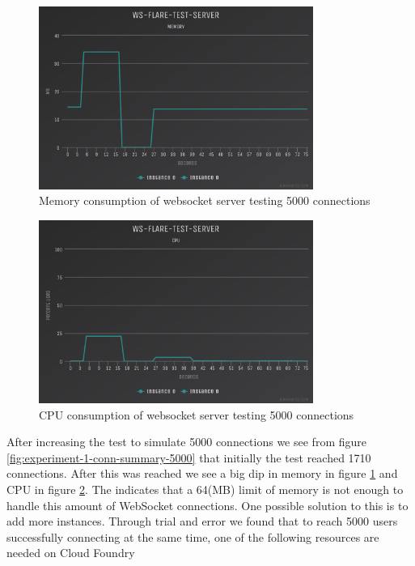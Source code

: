 \begin{figure}[H]
  \centering
    \includegraphics[width=0.8\textwidth]{figures/experiments/experiment-1/node-js/memory-5000.png}
    \caption{Memory consumption of websocket server testing 5000 connections}
    \label{fig:experiment-1-memory-5000}
\end{figure}

\begin{figure}[H]
  \centering
    \includegraphics[width=0.8\textwidth]{figures/experiments/experiment-1/node-js/cpu-5000.png}
    \caption{CPU consumption of websocket server testing 5000 connections}
    \label{fig:experiment-1-cpu-5000}
\end{figure}

After increasing the test to simulate 5000 connections we see from figure \ref{fig:experiment-1-conn-summary-5000} that initially the test reached 1710 connections. After this was reached we see a big dip in memory in figure \ref{fig:experiment-1-memory-5000} and CPU in figure \ref{fig:experiment-1-cpu-5000}. The indicates that a 64(MB) limit of memory is not enough to handle this amount of WebSocket connections. One possible solution to this is to add more instances. Through trial and error we found that to reach 5000 users successfully connecting at the same time, one of the following resources are needed on Cloud Foundry

